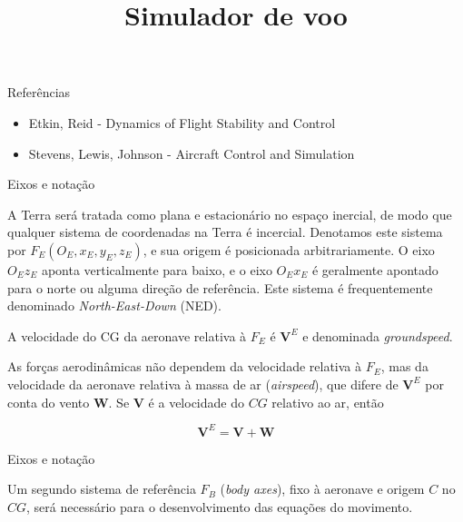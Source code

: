 \documentclass{beamer}
\title{Simulador de voo}
\institute{Nisus Aerodesign}
\date{}
\newcommand{\jindent}{\justifying\setlength{\parindent}{1.5em}}
\begin{document}
\footnotesize
\frame{\titlepage}

\begin{frame}{Referências}
\begin{itemize}
    \item { Etkin, Reid - Dynamics of Flight Stability and Control }
    \item { Stevens, Lewis, Johnson - Aircraft Control and Simulation }
\end{itemize}
\end{frame}


\begin{frame}{Eixos e notação}

    \jindent
    A Terra será tratada como plana e estacionário no espaço inercial, de modo que qualquer sistema de coordenadas na Terra é incercial. Denotamos este sistema por $F_E(O_E, x_E, y_E, z_E)$, e sua origem é posicionada arbitrariamente. O eixo $O_E z_E$ aponta verticalmente para baixo, e o eixo $O_E x_E$ é geralmente apontado para o norte ou alguma direção de referência. Este sistema é frequentemente denominado \textit{North-East-Down} (NED).
    
    \jindent
    A velocidade do CG da aeronave relativa à $F_E$ é $\mathbf{V}^E$ e denominada \textit{groundspeed}.
    
    \jindent
    As forças aerodinâmicas não dependem da velocidade relativa à $F_E$, mas da velocidade da aeronave relativa à massa de ar (\textit{airspeed}), que difere de $\mathbf{V}^E$ por conta do vento $\mathbf{W}$. Se $\mathbf{V}$ é a velocidade do $CG$ relativo ao ar, então

    \begin{equation*}
        \mathbf{V}^E = \mathbf{V} + \mathbf{W}        
    \end{equation*}
    
\end{frame}


\begin{frame}{Eixos e notação}

    \jindent
    Um segundo sistema de referência $F_B$ (\textit{body axes}), fixo à aeronave e origem $C$ no $CG$, será necessário para o desenvolvimento das equações do movimento.
    
\end{frame}
\end{document}
